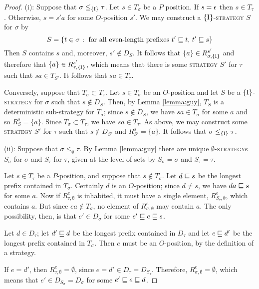 \documentclass{article}
\newcommand{\strategy}{\textsc{strategy}}
\begin{document}
\begin{proof}
  (i): Suppose that $\sigma\le_{\{\RN{1}\}}\tau$.  
  Let $s\in T_\sigma$ be a $P$ position.  
  If $s=\epsilon$ then $s\in T_\tau$.  
  Otherwise, $s=s'a$ for some $O$-position $s'$.  
  We may construct a $\{\RN{1}\}$-\strategy{} $S$ for $\sigma$ by
  \[
    S=\{t\in\sigma\;\colon\; \textrm{for all even-length prefixes $t'\sqsubseteq t$, $t'\sqsubseteq s$}\}
    \]
  Then $S$ contains $s$ and, moreover, $s'\not\in D_S$.  
  It follows that $\{a\}\in R_{\sigma,\{\RN{1}\}}^{s'}$ and therefore that $\{a\}\in R_{\tau,\{\RN{1}\}}^{s'}$, which means that there is some \strategy{} $S'$ for $\tau$ such that $sa\in T_{S'}$.  
  It follows that $sa\in T_\tau$.  

  Conversely, suppose that $T_\sigma\subset T_\tau$.  
  Let $s\in T_\sigma$ be an $O$-position and let $S$ be a $\{\RN{1}\}$-\strategy{} for $\sigma$ such that $s\not\in D_S$.  
  Then, by Lemma \ref{lemma:guy}, $T_S$ is a deterministic sub-strategy for $T_\sigma$; since $s\not\in D_S$, we have $sa\in T_\sigma$ for some $a$ and so $R_S^s=\{a\}$.  
  Since $T_\sigma\subset T_\tau$, we have $sa\in T_\tau$.  
  As above, we may construct some \strategy{} $S'$ for $\tau$ such that $s\not\in D_{S'}$ and $R_{S'}^s=\{a\}$.  
  It follows that $\sigma\le_{\{\RN{1}\}}\tau$.  

  (ii): Suppose that $\sigma\le_\emptyset\tau$.  
  By Lemma \ref{lemma:guy} there are unique $\emptyset$-\strategy{}s $S_\sigma$ for $\sigma$ and $S_\tau$ for $\tau$, given at the level of sets by $S_\sigma=\sigma$ and $S_\tau=\tau$.  

  Let $s\in T_\tau$ be a $P$-position, and suppose that $s\not\in T_\sigma$.  
  Let $d\sqsubseteq s$ be the longest prefix contained in $T_\sigma$.  
  Certainly $d$ is an $O$-position; since $d\ne s$, we have $da\sqsubseteq s$ for some $a$.  
  Now if $R_{\tau,\emptyset}^e$ is inhabited, it must have a single element, $R_{S_\tau, \emptyset}^e$, which contains $a$.  
  But since $ea\not\in T_\sigma$, no element of $R_{\sigma,\emptyset}^e$ may contain $a$.  
  The only possibility, then, is that $e'\in D_\sigma$ for some $e'\sqsubseteq e\sqsubseteq s$.

  Let $d\in D_\tau$; let $d'\sqsubseteq d$ be the longest prefix contained in $D_\tau$ and let $e\sqsubseteq d'$ be the longest prefix contained in $T_\sigma$.  
  Then $e$ must be an $O$-position, by the definition of a strategy.  

  If $e=d'$, then $R_{\tau,\emptyset}^e=\emptyset$, since $e=d'\in D_\tau = D_{S_\tau}$.  
  Therefore, $R_{\sigma,\emptyset}^e=\emptyset$, which means that $e'\in D_{S_\sigma}=D_\sigma$ for some $e'\sqsubseteq e\sqsubseteq d$.


\end{proof}
\end{document}
